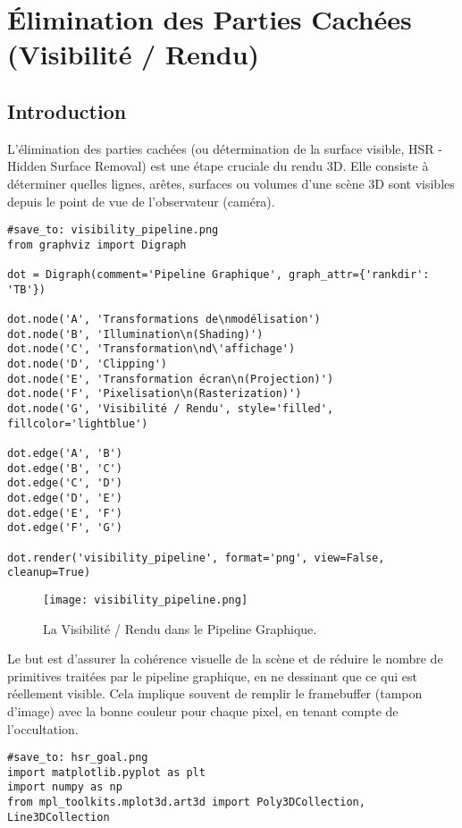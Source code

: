 \documentclass{article}
\begin{document}
{\section{Élimination des Parties Cachées (Visibilité / Rendu)}

\subsection{Introduction}
L'élimination des parties cachées (ou détermination de la surface visible, HSR - Hidden Surface Removal) est une étape cruciale du rendu 3D. Elle consiste à déterminer quelles lignes, arêtes, surfaces ou volumes d'une scène 3D sont visibles depuis le point de vue de l'observateur (caméra).

\begin{verbatim}
#save_to: visibility_pipeline.png
from graphviz import Digraph

dot = Digraph(comment='Pipeline Graphique', graph_attr={'rankdir': 'TB'})

dot.node('A', 'Transformations de\nmodélisation')
dot.node('B', 'Illumination\n(Shading)')
dot.node('C', 'Transformation\nd\'affichage')
dot.node('D', 'Clipping')
dot.node('E', 'Transformation écran\n(Projection)')
dot.node('F', 'Pixelisation\n(Rasterization)')
dot.node('G', 'Visibilité / Rendu', style='filled', fillcolor='lightblue')

dot.edge('A', 'B')
dot.edge('B', 'C')
dot.edge('C', 'D')
dot.edge('D', 'E')
dot.edge('E', 'F')
dot.edge('F', 'G')

dot.render('visibility_pipeline', format='png', view=False, cleanup=True)
\end{verbatim}

\begin{figure}[H]
\centering
\texttt{[image: visibility\_pipeline.png]}
\caption{La Visibilité / Rendu dans le Pipeline Graphique.}
\label{fig:visibility_pipeline}
\end{figure}

Le but est d'assurer la cohérence visuelle de la scène et de réduire le nombre de primitives traitées par le pipeline graphique, en ne dessinant que ce qui est réellement visible. Cela implique souvent de remplir le framebuffer (tampon d'image) avec la bonne couleur pour chaque pixel, en tenant compte de l'occultation.

\begin{verbatim}
#save_to: hsr_goal.png
import matplotlib.pyplot as plt
import numpy as np
from mpl_toolkits.mplot3d.art3d import Poly3DCollection, Line3DCollection


\end{verbatim}}
\end{document}
